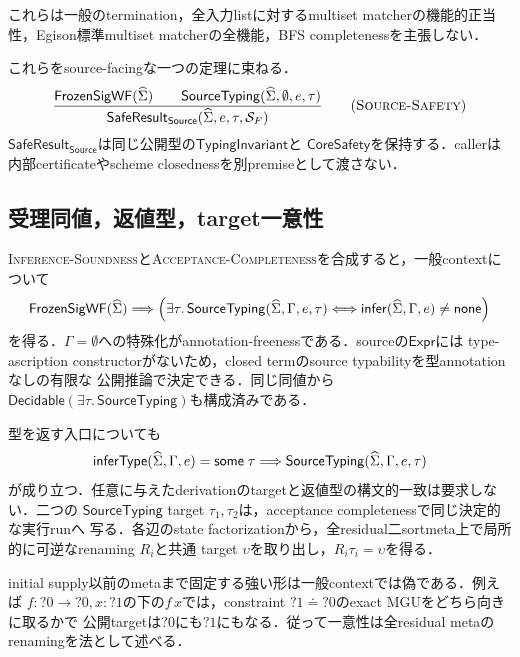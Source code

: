 これらは一般のtermination，全入力listに対するmultiset matcherの機能的正当性，Egison標準multiset
matcherの全機能，BFS completenessを主張しない．

これらをsource-facingな一つの定理に束ねる．
\[
\frac{
  \mathsf{FrozenSigWF}(\Sighat)
  \qquad
  \mathsf{SourceTyping}(\Sighat,\emptyset,e,\tau)
}{
  \mathsf{SafeResult}_{\mathsf{Source}}(\Sighat,e,\tau,\mathcal S_F)
}
\tag{\textsc{Source-Safety}}
\]
$\mathsf{SafeResult}_{\mathsf{Source}}$は同じ公開型の$\mathsf{TypingInvariant}$と
$\mathsf{CoreSafety}$を保持する．callerは内部certificateやscheme closednessを別premiseとして渡さない．

\subsection{受理同値，返値型，target一意性}

\textsc{Inference-Soundness}と\textsc{Acceptance-Completeness}を合成すると，一般contextについて
\[
\mathsf{FrozenSigWF}(\widehat{\Sigma})
\Longrightarrow
\left(
\exists\tau.\,\mathsf{SourceTyping}(\widehat{\Sigma},\Gamma,e,\tau)
\Longleftrightarrow
\mathsf{infer}(\widehat{\Sigma},\Gamma,e)\ne\mathsf{none}
\right)
\]
を得る．$\Gamma=\emptyset$への特殊化がannotation-freenessである．sourceの$\mathsf{Expr}$には
type-ascription constructorがないため，closed termのsource typabilityを型annotationなしの有限な
公開推論で決定できる．同じ同値から
$\mathsf{Decidable}(\exists\tau.\,\mathsf{SourceTyping})$も構成済みである．

型を返す入口についても
\[
\mathsf{inferType}(\widehat{\Sigma},\Gamma,e)=\mathsf{some}\;\tau
\Longrightarrow
\mathsf{SourceTyping}(\widehat{\Sigma},\Gamma,e,\tau)
\]
が成り立つ．任意に与えたderivationのtargetと返値型の構文的一致は要求しない．二つの
$\mathsf{SourceTyping}$ target $\tau_1,\tau_2$は，acceptance completenessで同じ決定的な実行runへ
写る．各辺のstate factorizationから，全residual二sortmeta上で局所的に可逆なrenaming $R_i$と共通
target $\upsilon$を取り出し，$R_i\tau_i=\upsilon$を得る．

initial supply以前のmetaまで固定する強い形は一般contextでは偽である．例えば
$f:?0\to ?0, x:?1$の下の$f\,x$では，constraint $?1\doteq ?0$のexact MGUをどちら向きに取るかで
公開targetは$?0$にも$?1$にもなる．従って一意性は全residual metaのrenamingを法として述べる．

